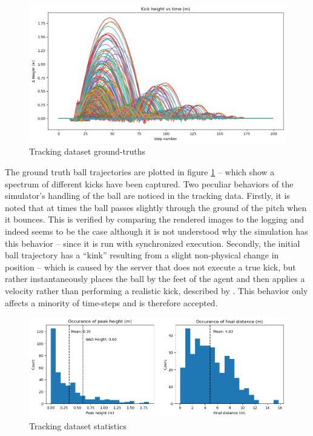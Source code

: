 \documentclass[a4paper,twoside,12pt]{report}
\begin{document}
\begin{figure}[h!]
\begin{center}
\includegraphics[width=14cm]{images/plotkicks.png}
\caption{Tracking dataset ground-truths}
\label{fig:plotkicks}
\end{center}
\end{figure}

The ground truth ball trajectories are plotted in figure \ref{fig:plotkicks} -- which show a spectrum of different kicks have been captured. Two peculiar behaviors of the simulator's handling of the ball are noticed in the tracking data. Firstly, it is noted that at times the ball passes slightly through the ground of the pitch when it bounces. This is verified by comparing the rendered images to the logging and indeed seems to be the case although it is not understood why the simulation has this behavior -- since it is run with synchronized execution. Secondly, the initial ball trajectory has a ``kink'' resulting from a slight non-physical change in position -- which is caused by the server that does not execute a true kick, but rather instantaneously places the ball by the feet of the agent and then applies a velocity rather than performing a realistic kick, described by \cite{fatproxy}. This behavior only affects a minority of time-steps and is therefore accepted.

\begin{figure}[h!]
\begin{center}
\includegraphics[width=16cm]{images/trackingplot.png}
\caption{Tracking dataset statistics}
\label{fig:trackplot}
\end{center}
\end{figure}
\end{document}
